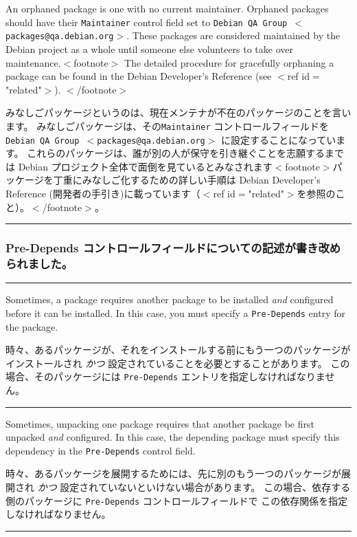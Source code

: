 \documentclass[mingoth,a4paper]{jsarticle}
\begin{document}
\par
\parbox[t]{0.48\linewidth}{
	  An orphaned package is one with no current maintainer.  Orphaned
	  packages should have their {\tt Maintainer} control field set
	  to {\tt Debian QA Group $<$packages@qa.debian.org$>$}.
	  These packages are considered maintained by the Debian project
	  as a whole until someone else volunteers to take over
	  maintenance.$<$footnote$>$
	    The detailed procedure for gracefully orphaning a package can
	    be found in the Debian Developer's Reference
	    (see $<$ref id$=$"related"$>$).
	  $<$/footnote$>$
}\hfil 
\parbox[t]{0.48\linewidth}{
	  みなしごパッケージというのは、現在メンテナが不在のパッケージのことを言います。
	  みなしごパッケージは、その{\tt Maintainer} コントロールフィールドを
	   {\tt Debian QA Group $<$packages@qa.debian.org$>$} に設定することになっています。
          これらのパッケージは、誰が別の人が保守を引き継ぐことを志願するまでは
	   Debian プロジェクト全体で面倒を見ているとみなされます$<$footnote$>$パッケージを丁重にみなしご化するための詳しい手順は Debian Developer's Reference (開発者の手引き)に載っています（$<$ref id$=$"related"$>$を参照のこと）。$<$/footnote$>$。  
}
\hrule
\vspace{1ex}

\clearpage

\subsubsection{Pre-Depends コントロールフィールドについての記述が書き改められました。}

\vspace*{1ex}
\hrule
{}\par
\parbox[t]{0.48\linewidth}{
	    Sometimes, a package requires another package to be
	    installed {\em and} configured before it can be
	    installed. In this case, you must specify a
	    {\tt Pre-Depends} entry for the package.
            }\hfil 
\parbox[t]{0.48\linewidth}{
	    時々、あるパッケージが、それをインストールする前にもう一つのパッケージがインストールされ
	    {\em かつ} 設定されていることを必要とすることがあります。
	    この場合、そのパッケージには
	    {\tt Pre-Depends} エントリを指定しなければなりません。
}
\hrule

\par
\parbox[t]{0.48\linewidth}{
	  Sometimes, unpacking one package requires that another package
	  be first unpacked {\em and} configured.  In this case, the
	  depending package must specify this dependency in
	  the {\tt Pre-Depends} control field.
}\hfil 
\parbox[t]{0.48\linewidth}{
	    時々、あるパッケージを展開するためには、先に別のもう一つのパッケージが展開され
	    {\em かつ} 設定されていないといけない場合があります。
	    この場合、依存する側のパッケージに {\tt Pre-Depends} コントロールフィールドで
	    この依存関係を指定しなければなりません。
}
\hrule
\vspace{1ex}
\end{document}
